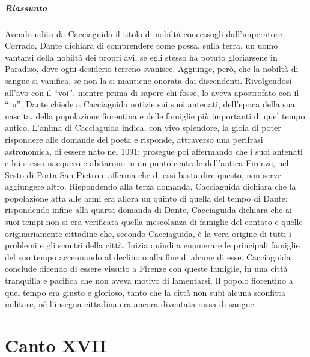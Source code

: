 \documentclass[a4paper, twoside, titlepage]{book}
\begin{document}
\paragraph{Riassunto} Avendo udito da Cacciaguida il titolo di nobiltà concessogli dall’imperatore Corrado, Dante dichiara di comprendere come possa, sulla terra, un uomo vantarsi della nobiltà dei propri avi, se egli stesso ha potuto gloriarsene in Paradiso, dove ogni desiderio terreno svanisce. Aggiunge, però, che la nobiltà di sangue si vanifica, se non la si mantiene onorata dai discendenti.
Rivolgendosi all’avo con il “voi”, mentre prima di sapere chi fosse, lo aveva apostrofato con il “tu”, Dante chiede a Cacciaguida notizie sui suoi antenati, dell’epoca della sua nascita, della popolazione fiorentina e delle famiglie più importanti di quel tempo antico.
L’anima di Cacciaguida indica, con vivo splendore, la gioia di poter rispondere alle domande del poeta e risponde, attraverso una perifrasi astronomica, di essere nato nel 1091; prosegue poi affermando che i suoi antenati e lui stesso nacquero e abitarono in un punto centrale dell’antica Firenze, nel Sesto di Porta San Pietro e afferma che di essi basta dire questo, non serve aggiungere altro.
Rispondendo alla terza domanda, Cacciaguida dichiara che la popolazione atta alle armi era allora un quinto di quella del tempo di Dante; rispondendo infine alla quarta domanda di Dante, Cacciaguida dichiara che ai suoi tempi non si era verificata quella mescolanza di famiglie del contato e quelle originariamente cittadine che, secondo Cacciaguida, è la vera origine di tutti i problemi e gli scontri della città. Inizia quindi a enumerare le principali famiglie del suo tempo accennando al declino o alla fine di alcune di esse.
Cacciaguida conclude dicendo di essere vissuto a Firenze con queste famiglie, in una città tranquilla e pacifica che non aveva motivo di lamentarsi. Il popolo fiorentino a quel tempo era giusto e glorioso, tanto che la città non subì alcuna sconfitta militare, né l'insegna cittadina era ancora diventata rossa di sangue.

\chapter{Canto XVII}
\end{document}
